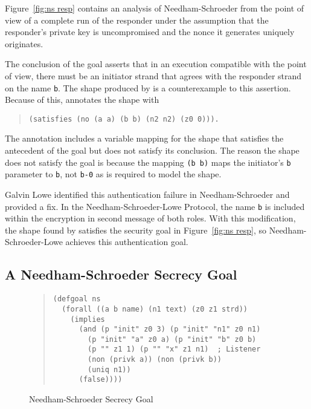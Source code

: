 Figure~\ref{fig:ns resp} contains an analysis of Needham-Schroeder
from the point of view of a complete run of the responder under the
assumption that the responder's private key is uncompromised and the
nonce it generates uniquely originates.

The conclusion of the goal asserts that in an execution compatible
with the point of view, there must be an initiator strand that agrees
with the responder strand on the name \texttt{b}.  The shape produced
by {\cpsa} is a counterexample to this assertion.  Because of this,
{\cpsa} annotates the shape with
\begin{quote}
\begin{verbatim}
(satisfies (no (a a) (b b) (n2 n2) (z0 0))).
\end{verbatim}
\end{quote}
The annotation includes a variable mapping for the shape that
satisfies the antecedent of the goal but does not satisfy its
conclusion.  The reason the shape does not satisfy the goal is because
the mapping \texttt{(b b)} maps the initiator's \texttt{b} parameter
to \texttt{b}, not \texttt{b-0} as is required to model the shape.

Galvin Lowe identified this authentication failure in
Needham-Schroeder and provided a fix.  In the Needham-Schroeder-Lowe
Protocol, the name \texttt{b} is included within the encryption in second
message of both roles.  With this modification, the shape found by
{\cpsa} satisfies the security goal in Figure~\ref{fig:ns resp}, so
Needham-Schroeder-Lowe achieves this authentication goal.

\subsection{A Needham-Schroeder Secrecy Goal}\label{sec:secrecy goal}

\begin{figure}
\begin{quote}\small
\begin{verbatim}
(defgoal ns
  (forall ((a b name) (n1 text) (z0 z1 strd))
    (implies
      (and (p "init" z0 3) (p "init" "n1" z0 n1)
        (p "init" "a" z0 a) (p "init" "b" z0 b)
        (p "" z1 1) (p "" "x" z1 n1)  ; Listener
        (non (privk a)) (non (privk b))
        (uniq n1))
      (false))))
\end{verbatim}
\end{quote}
\caption{Needham-Schroeder Secrecy Goal}\label{fig:ns secrecy}
\end{figure}

